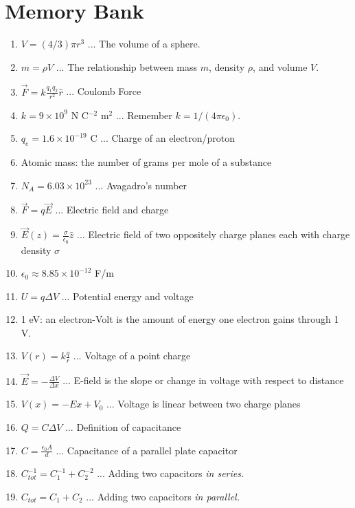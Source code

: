 \documentclass[10pt]{article}
\begin{document}
\maketitle

\section{Memory Bank}

\begin{enumerate}
\item $V = (4/3) \pi r^3$ ... The volume of a sphere.
\item $m = \rho V$ ... The relationship between mass $m$, density $\rho$, and volume $V$.
\item $\vec{F} = k \frac{q_1 q_2}{r^2}\hat{r}$ ... Coulomb Force
\item $k = 9 \times 10^{9}$ N C$^{-2}$ m$^{2}$ ... Remember $k = 1/(4\pi \epsilon_0)$.
\item $q_e = 1.6 \times 10^{-19}$ C ... Charge of an electron/proton
\item Atomic mass: the number of grams per mole of a substance
\item $N_A = 6.03 \times 10^{23}$ ... Avagadro's number
\item $\vec{F} = q \vec{E}$ ... Electric field and charge
\item $\vec{E}(z) = \frac{\sigma}{\epsilon_0}\hat{z}$ ... Electric field of two oppositely charge planes each with charge density $\sigma$
\item $\epsilon_0 \approx 8.85 \times 10^{-12}$ F/m
\item $U = q\Delta V$ ... Potential energy and voltage
\item 1 eV: an electron-Volt is the amount of energy one electron gains through 1 V.
\item $V(r) = k\frac{q}{r}$ ... Voltage of a point charge
\item $\vec{E} = -\frac{\Delta V}{\Delta x}$ ... E-field is the slope or change in voltage with respect to distance
\item $V(x) = -E x + V_0$ ... Voltage is linear between two charge planes
\item $Q = C\Delta V$ ... Definition of capacitance
\item $C = \frac{\epsilon_0 A}{d}$ ... Capacitance of a parallel plate capacitor
\item $C_{tot}^{-1} = C_1^{-1} + C_2^{-2}$ ... Adding two capacitors \textit{in series.}
\item $C_{tot} = C_1 + C_2$ ... Adding two capacitors \textit{in parallel.}

\end{enumerate}
\end{document}
